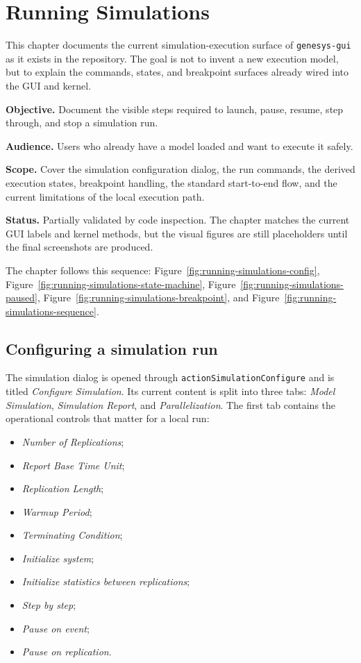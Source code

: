 \chapter{Running Simulations}
\label{chap:running-simulations}

This chapter documents the current simulation-execution surface of
\texttt{genesys-gui} as it exists in the repository. The goal is not to invent a
new execution model, but to explain the commands, states, and breakpoint
surfaces already wired into the GUI and kernel.

\noindent\textbf{Objective.} Document the visible steps required to launch,
pause, resume, step through, and stop a simulation run.

\noindent\textbf{Audience.} Users who already have a model loaded and want to
execute it safely.

\noindent\textbf{Scope.} Cover the simulation configuration dialog, the run
commands, the derived execution states, breakpoint handling, the standard
start-to-end flow, and the current limitations of the local execution path.

\noindent\textbf{Status.} Partially validated by code inspection. The chapter
matches the current GUI labels and kernel methods, but the visual figures are
still placeholders until the final screenshots are produced.

The chapter follows this sequence:
Figure~\ref{fig:running-simulations-config},
Figure~\ref{fig:running-simulations-state-machine},
Figure~\ref{fig:running-simulations-paused},
Figure~\ref{fig:running-simulations-breakpoint}, and
Figure~\ref{fig:running-simulations-sequence}.

\section{Configuring a simulation run}
\label{sec:running-simulations-configuring}

The simulation dialog is opened through \texttt{actionSimulationConfigure} and
is titled \textit{Configure Simulation}. Its current content is split into
three tabs: \textit{Model Simulation}, \textit{Simulation Report}, and
\textit{Parallelization}. The first tab contains the operational controls that
matter for a local run:
\begin{itemize}
\item \textit{Number of Replications};
\item \textit{Report Base Time Unit};
\item \textit{Replication Length};
\item \textit{Warmup Period};
\item \textit{Terminating Condition};
\item \textit{Initialize system};
\item \textit{Initialize statistics between replications};
\item \textit{Step by step};
\item \textit{Pause on event};
\item \textit{Pause on replication}.
\end{itemize}

